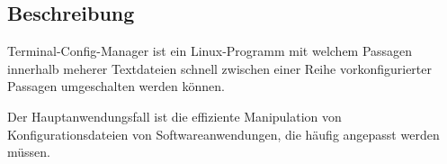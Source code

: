 \subsection{Beschreibung}
Terminal-Config-Manager ist ein Linux-Programm mit welchem
Passagen innerhalb meherer Textdateien schnell zwischen einer Reihe
vorkonfigurierter Passagen umgeschalten werden können.

Der Hauptanwendungsfall ist die effiziente  Manipulation von
Konfigurationsdateien von Softwareanwendungen, die häufig angepasst
werden müssen.